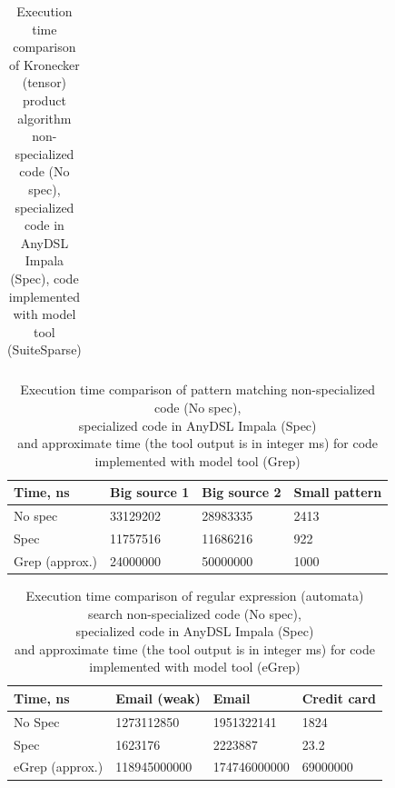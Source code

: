 \documentclass[conference]{IEEEtran}
\begin{document}
\begin{table}[!h]
\begin{tabular}{|l|l|l|l|l|l|}
	\end{tabular}\bigskip
	\centering
	\caption{Execution time comparison of Kronecker (tensor) product algorithm non-specialized code (No spec),\\ specialized code in AnyDSL Impala (Spec), code implemented with model tool (SuiteSparse)}
	
	\label{table_graph_kron}
\end{table}




\begin{table}[]
	\begin{tabular}{|l|l|l|l|} \hline
		Time, ns       & Big source 1 & Big source 2 & Small pattern \\ \hline
		No spec        & 33129202     & 28983335     & 2413          \\ \hline
		Spec           & 11757516     & 11686216     & 922           \\ \hline
		Grep (approx.) & 24000000     & 50000000     & 1000          \\   \hline
	\end{tabular}\bigskip
	\centering
	\caption{Execution time comparison of pattern matching non-specialized code (No spec),\\ specialized code in AnyDSL Impala (Spec) \\ and approximate time (the tool output is in integer ms) for code implemented with model tool (Grep)}
	\label{table_string}
\end{table}

\begin{table}[]
	\begin{tabular}{|l|l|l|l|} \hline
		Time, ns        & Email (weak) & Email        & Credit card \\ \hline
		No Spec         & 1273112850   & 1951322141   & 1824        \\ \hline
		Spec            & 1623176      & 2223887      & 23.2        \\ \hline
		eGrep (approx.) & 118945000000 & 174746000000 & 69000000    \\ \hline
	\end{tabular}\bigskip
	\centering
	\caption{Execution time comparison of regular expression (automata) search non-specialized code (No spec),\\ specialized code in AnyDSL Impala (Spec) \\ and approximate time (the tool output is in integer ms) for code implemented with model tool (eGrep)}
	\label{table_regex}
\end{table}
\end{document}
